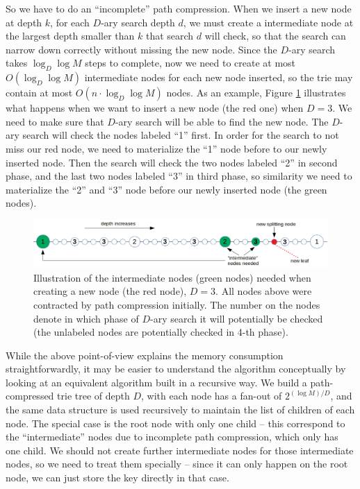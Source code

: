 \documentclass[11pt, usletter]{article}
\begin{document}
So we have to do an ``incomplete'' path compression. 
When we insert a new node at depth $k$,
for each $D$-ary search depth $d$,
we must create a intermediate node at the largest depth smaller than $k$ that search $d$ will check, 
so that the search can narrow down correctly without missing the new node. 
Since the $D$-ary search takes $\log_D\log M$ steps to complete, 
now we need to create at most $O(\log_D\log M)$ intermediate nodes for each new node inserted, 
so the trie may contain at most $O(n\cdot \log_D\log M)$ nodes. 
As an example, Figure \ref{intermediate_nodes} illustrates what happens when we want to insert
a new node (the red one) when $D=3$. 
We need to make sure that $D$-ary search will be able to find the new node. 
The $D$-ary search will check the nodes labeled ``1'' first. 
In order for the search to not miss our red node, we need to materialize the ``1'' node before to our newly inserted node. 
Then the search will check the two nodes labeled ``2'' in second phase, and the last two nodes labeled ``3'' in third phase,
so similarity we need to materialize the ``2'' and ``3'' node before our newly inserted node (the green nodes).

\begin{figure}[!htb]
  \includegraphics[width=\linewidth]{intermediate_nodes.png}
\caption{Illustration of the intermediate nodes (green nodes) needed when creating a new node (the red node), $D=3$. 
All nodes above were contracted by path compression initially.
The number on the nodes denote in which phase of $D$-ary search 
it will potentially be checked (the unlabeled nodes are potentially checked in 4-th phase).}
\label{intermediate_nodes}
\end{figure}

While the above point-of-view explains the memory consumption straightforwardly, 
it may be easier to understand the algorithm conceptually 
by looking at an equivalent algorithm built in a recursive way. 
We build a path-compressed trie tree of depth $D$, with each node has a fan-out of $2^{(\log M)/D}$, 
and the same data structure is used recursively to maintain the list of children of each node.
The special case is the root node with only one child -- 
this correspond to the ``intermediate'' nodes due to incomplete path compression, which only has one child. 
We should not create further intermediate nodes for those intermediate nodes, 
so we need to treat them specially -- since it can only happen on the root node, 
we can just store the key directly in that case. 
\end{document}
